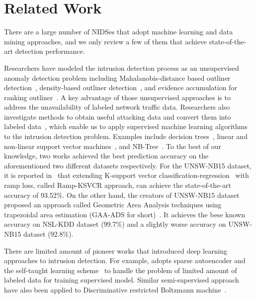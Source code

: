 \section{Related Work}
There are a large number of NIDSes that adopt machine learning and data mining approaches,
and we only review a few of them that achieve state-of-the-art detection performance.

Researchers have modeled the intrusion detection process as an unsupervised
anomaly detection problem including Mahalanobis-distance based outliner detection~\cite{ComparativeAnomalyNIDS}, density-based outliner detection~\cite{LOF, ComparativeAnomalyNIDS}, and evidence accumulation for ranking outliner~\cite{RankingOutliner}.
A key advantage of those unsupervised approaches is to address the unavailability of labeled network traffic data. Researchers also investigate methods to obtain useful attacking data and convert them into labeled data~\cite{DARPA, KDDCup, NSL-KDD, UNSW, UNSW1}, which enable us to apply supervised machine learning algorithms to the intrusion detection problem.
Examples include decision trees~\cite{DecisionTree}, linear and non-linear support vector machines~\cite{SVM}, and NB-Tree~\cite{NB-Tree}. To the best of our knowledge, two works achieved the best prediction accuracy on the aforementioned two different datasets respectively.
For the UNSW-NB15 dataset, it is reported in~\cite{RampLossKSVCR} that extending K-support vector
classification-regression~\cite{KSVCR} with ramp loss, called Ramp-KSVCR approach, can achieve the state-of-the-art accuracy of 93.52\%.
On the other hand, the creators of UNSW-NB15 dataset~\cite{UNSW} proposed an approach called
Geometric Area Analysis techniques using trapezoidal area estimation (GAA-ADS for short)~\cite{GAA-ADS}.
It achieves the bese known accuracy on NSL-KDD dataset (99.7\%) and
a slightly worse accuracy on UNSW-NB15 dataset (92.8\%).

There are limited amount of pioneer works that introduced deep learning approaches to intrusion detection.
For example, \cite{STL-NIDS} adopts sparse autoencoder and the self-taught learning
scheme~\cite{SparseAE} to handle the problem of limited amount of labeled data for training supervised model.
Similar semi-supervised approach have also been applied to
Discriminative restricted Boltzmann machine~\cite{AnomalyDetectionRBM}.